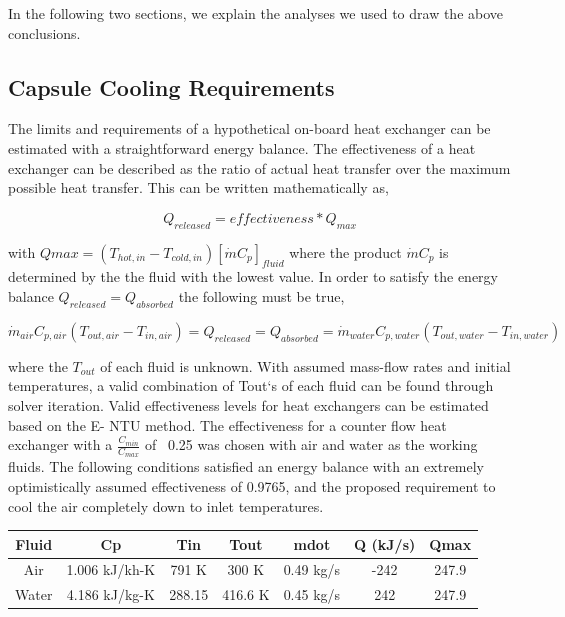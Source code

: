 \documentclass[heading.tex]{subfiles}
\begin{document}
In the following two sections, we explain the analyses we used to draw the above conclusions.

\subsection{Capsule Cooling Requirements}

The limits and requirements of a hypothetical on-board heat exchanger can be estimated with a straightforward energy balance. The
effectiveness of a heat exchanger can be described as the ratio of actual heat transfer over the maximum possible heat transfer. This can
be written mathematically as,

\begin{equation*}
{Q}_{released}  = effectiveness * {Q}_{max}
\end{equation*}


with $Qmax=\left(T_{hot,in} - T_{cold,in}\right) [ \dot{m} C_{p} ]_{fluid}$ where the product $\dot{m} C_{p}$ is determined by the the fluid with the lowest
value. In order to satisfy the energy balance $Q_{released}=Q_{absorbed}$ the following must be true,

\begin{equation*}
\dot{m}_{air} C_{p, air} (T_{out, air} - T_{in, air}) = {Q}_{released} = {Q}_{absorbed}= \dot{m}_{water} C_{p,water} (T_{out, water} - T_{in, water})
\end{equation*}

where the $T_{out}$  of each fluid is unknown. With assumed mass-flow rates and initial temperatures, a valid combination of Tout‘s of
each fluid can be found through solver iteration. Valid effectiveness levels for heat exchangers can be estimated based on the E- NTU
method. The effectiveness for a counter flow heat exchanger with a $\frac{C_{min}}{C_{max}}$ of ~0.25 was chosen with air and water as the working fluids. 
The following conditions satisfied an energy balance with an extremely optimistically assumed effectiveness of 0.9765, and the proposed requirement to cool the
air completely down to inlet temperatures.

\begin{tabular}{|c|c|c|c|c|c|c|}
\hline 
Fluid & Cp & Tin & Tout & mdot & Q (kJ/s) & Qmax \\ 
\hline 
Air & 1.006 kJ/kh-K & 791 K & 300 K & 0.49 kg/s & -242 & 247.9 \\ 
\hline 
Water & 4.186 kJ/kg-K & 288.15 & 416.6 K  & 0.45 kg/s & 242 & 247.9 \\ 
\hline 
\end{tabular} 
\end{document}
